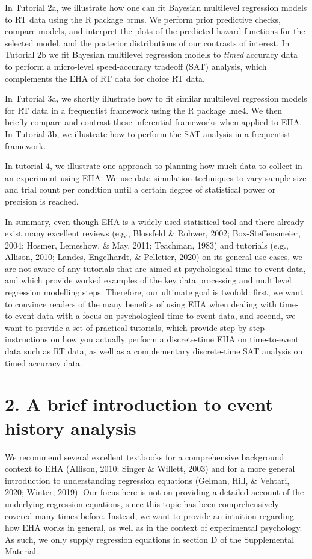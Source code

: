 \documentclass[
  man, donotrepeattitle,floatsintext]{apa6}
\begin{document}
In Tutorial 2a, we illustrate how one can fit Bayesian multilevel regression models to RT data using the R package brms. We perform prior predictive checks, compare models, and interpret the plots of the predicted hazard functions for the selected model, and the posterior distributions of our contrasts of interest. In Tutorial 2b we fit Bayesian multilevel regression models to \emph{timed} accuracy data to perform a micro-level speed-accuracy tradeoff (SAT) analysis, which complements the EHA of RT data for choice RT data.

In Tutorial 3a, we shortly illustrate how to fit similar multilevel regression models for RT data in a frequentist framework using the R package lme4. We then briefly compare and contrast these inferential frameworks when applied to EHA. In Tutorial 3b, we illustrate how to perform the SAT analysis in a frequentist framework.

In tutorial 4, we illustrate one approach to planning how much data to collect in an experiment using EHA. We use data simulation techniques to vary sample size and trial count per condition until a certain degree of statistical power or precision is reached.

In summary, even though EHA is a widely used statistical tool and there already exist many excellent reviews (e.g., Blossfeld \& Rohwer, 2002; Box-Steffensmeier, 2004; Hosmer, Lemeshow, \& May, 2011; Teachman, 1983) and tutorials (e.g., Allison, 2010; Landes, Engelhardt, \& Pelletier, 2020) on its general use-cases, we are not aware of any tutorials that are aimed at psychological time-to-event data, and which provide worked examples of the key data processing and multilevel regression modelling steps.
Therefore, our ultimate goal is twofold: first, we want to convince readers of the many benefits of using EHA when dealing with time-to-event data with a focus on psychological time-to-event data, and second, we want to provide a set of practical tutorials, which provide step-by-step instructions on how you actually perform a discrete-time EHA on time-to-event data such as RT data, as well as a complementary discrete-time SAT analysis on timed accuracy data.

\section{2. A brief introduction to event history analysis}\label{a-brief-introduction-to-event-history-analysis}

We recommend several excellent textbooks for a comprehensive background context to EHA (Allison, 2010; Singer \& Willett, 2003) and for a more general introduction to understanding regression equations (Gelman, Hill, \& Vehtari, 2020; Winter, 2019). Our focus here is not on providing a detailed account of the underlying regression equations, since this topic has been comprehensively covered many times before. Instead, we want to provide an intuition regarding how EHA works in general, as well as in the context of experimental psychology. As such, we only supply regression equations in section D of the Supplemental Material.
\end{document}
